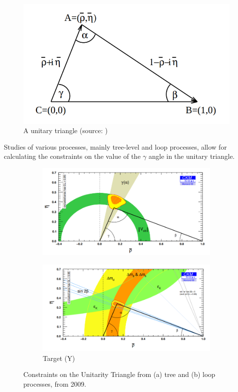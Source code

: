 \begin{figure}
  \centering
  \includegraphics[width=0.6\linewidth]{figures/chapter1/UnitaryTriangle.png}
  \caption{A unitary triangle (source: \cite{buras2002unitarity})}
  \label{fig:unitary_triangle}
\end{figure}

Studies of various processes, mainly tree-level and loop processes, allow for calculating the constraints on the value of the $\gamma$ angle in the unitary triangle.


\begin{figure}[H]
\centering
\begin{subfigure}[b]{0.85\textwidth}
    \centering
    \includegraphics[width=\linewidth]{figures/chapter1/lhcb_goals_a.png}
\caption{}
   \label{plot:plot_triangle_a}
  \end{subfigure}
\begin{subfigure}[b]{0.85\textwidth}
    \centering
    \includegraphics[width=\linewidth]{figures/chapter1/lhcb_goals_b.png}
\caption{Target (Y)}
   \label{plot:plot_triangle_b}
  \end{subfigure}
  \caption[Triangle constraints]{Constraints on the Unitarity Triangle from (a) tree and (b) loop processes, from 2009.}
    \label{plot:both_triangles}
\end{figure}

